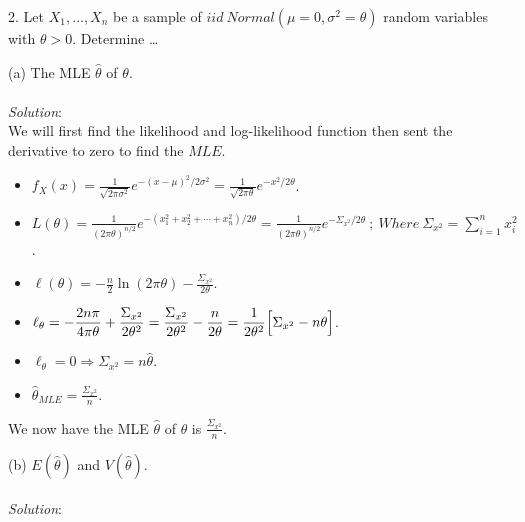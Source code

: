 \documentclass[12pt]{article}
\newcommand{\XB}{\color{black}}
\newcommand{\XBB}{\color{blue}}
\newcommand{\ds}{\displaystyle}
\begin{document}
2. Let $ X_{1}, \dots , X_{n} $ be a sample of $ iid \ Normal(\mu = 0, \sigma^{2} = \theta) $ random variables
with $ \theta > 0 $. Determine \dots \\

\XBB\hrulefill\XB
\vspace{5mm}

(a) The MLE $ \hat{\theta} $ of $ \theta $. \\
\vspace{2.5mm} \\
\textit{Solution}:
\vspace{2.5mm} \\

\noindent
We will first find the likelihood and log-likelihood function then sent the derivative to zero to find the $ MLE $. \\

\begin{itemize}
    \item $ \ds f_{X}(x) = \frac{1}{\sqrt{2\pi\sigma^{2}}}e^{-(x - \mu)^{2}/2\sigma^{2}} = \frac{1}{\sqrt{2\pi\theta}}e^{-x^{2}/2\theta} $.
    \item $ \ds L(\theta) = \frac{1}{(2\pi\theta)^{n/2}}e^{-(x_{1}^{2} + x_{2}^{2} + \cdots + x_{n}^{2})/2\theta} = \frac{1}{(2\pi\theta)^{n/2}}e^{-\Sigma_{x^{2}}/2\theta} \ ; \ Where \ \Sigma_{x^{2}} = \sum_{i=1}^{n} x_{i}^{2} $.
    \item $ \ds \ell(\theta) = -\frac{n}{2}\ln(2\pi\theta) - \frac{\Sigma_{x^{2}}}{2\theta} $.
    \item $ \ds \ell_{\theta} = -\frac{2n\pi}{4\pi\theta} + \frac{\Sigma_{x^{2}}}{2\theta^{2}} = \frac{\Sigma_{x^{2}}}{2\theta^{2}} -\frac{n}{2\theta} = \frac{1}{2\theta^{2}}\Bigl[ \Sigma_{x^{2}} - n\theta \Bigr] $.
    \item $ \ds \ell_{\theta} = 0 \Rightarrow \Sigma_{x^{2}} = n\hat{\theta} $.
    \item $ \ds \hat{\theta}_{MLE} = \frac{\Sigma_{x^{2}}}{n} $.
\end{itemize}

\noindent
We now have the MLE $ \hat{\theta} $ of $ \theta $ is $ \ds \frac{\Sigma_{x^{2}}}{n} $. \\

\vspace{2.5mm}

(b) $ E(\hat{\theta}) $ and $ V(\hat{\theta}) $. \\
\vspace{2.5mm} \\
\textit{Solution}:
\vspace{2.5mm} \\
\end{document}
